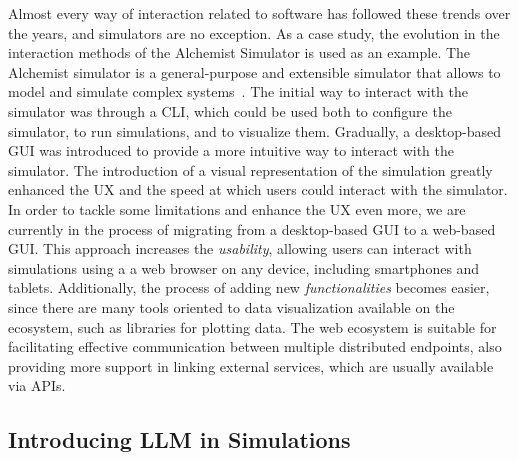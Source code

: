 \documentclass[conference]{IEEEtran}
\begin{document}
Almost every way of interaction related to software has followed these trends over the years,
and simulators are no exception.
As a case study,
the evolution in the interaction methods of the Alchemist Simulator is used as an example.
%
The Alchemist simulator is a general-purpose and extensible simulator that allows to model and simulate complex systems~\cite{Pianini_2013}.
%
The initial way to interact with the simulator was through a \ac{CLI},
which could be used both to configure the simulator,
to run simulations,
and to visualize them.
%
Gradually,
a desktop-based \ac{GUI} was introduced to provide a more intuitive way to interact with the simulator.
%
The introduction of a visual representation of the simulation greatly enhanced the \ac{UX} and the speed at which users could interact with the simulator.
%
In order to tackle some limitations and enhance the \ac{UX} even more,
we are currently in the process of migrating from a desktop-based \ac{GUI} to a web-based \ac{GUI}.
%
This approach increases the \emph{usability},
allowing users can interact with simulations using a a web browser on any device,
including smartphones and tablets.
%
Additionally,
the process of adding new \emph{functionalities} becomes easier,
since there are many tools oriented to data visualization available on the ecosystem,
such as libraries for plotting data.
%
The web ecosystem is suitable for facilitating effective communication between multiple distributed endpoints,
also providing more support in linking external services,
which are usually available via \acp{API}.
%

\subsection{Introducing \ac{LLM} in Simulations}
\end{document}
